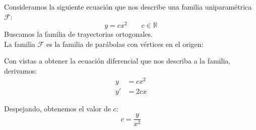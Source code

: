 \begin{ejemplo}
    Consideramos la siguiente ecuación que nos describe una familia uniparamétrica $\mathcal{F}$:
    \begin{equation*}
        y = cx^2 \qquad c\in \mathbb{R}
    \end{equation*}
    Buscamos la familia de trayectorias ortogonales.\\

    La familia $\mathcal{F}$ es la familia de parábolas con vértices en el origen:
    \ifdefined\showimages
    \begin{center}
    \end{center}
    \fi

    Con vistas a obtener la ecuación diferencial que nos describa a la familia, derivamos:
    \begin{align*}
        y &= cx^2 \\
        y' &= 2cx
    \end{align*}

    Despejando, obtenemos el valor de $c$:
    \begin{equation*}
        c = \dfrac{y}{x^2}
    \end{equation*}


\end{ejemplo}

